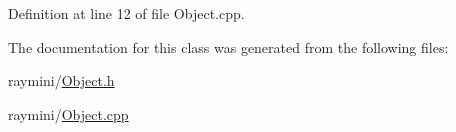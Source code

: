 Definition at line 12 of file Object.cpp.



The documentation for this class was generated from the following files:\begin{DoxyCompactItemize}
\item 
raymini/\hyperlink{_object_8h}{Object.h}\item 
raymini/\hyperlink{_object_8cpp}{Object.cpp}\end{DoxyCompactItemize}
